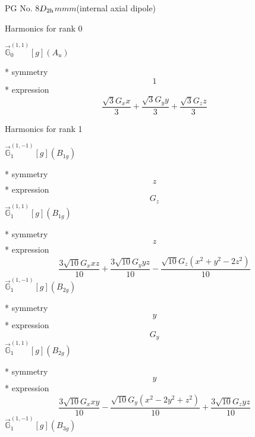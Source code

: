 \documentclass[fleqn,8pt]{jsarticle}
\begin{document}
\setcounter{MaxMatrixCols}{32}

\renewcommand{\tablename}{Table~}
\renewcommand{\figurename}{Figure~}
\begin{center}
\LARGE
PG No. 8\quad$D_{\rm 2h}$\quad$mmm$\quad[ orthorhombic ] (internal axial dipole)
\end{center}

\noindent * Harmonics for rank 0

\noindent\quad $\vec{\mathbb{G}}_{0}^{(1,1)}[g](A_{u})$

\noindent\quad ** symmetry
\begin{dmath*}
1
\end{dmath*}
\noindent\quad ** expression
\begin{dmath*}
\frac{\sqrt{3} G_{x} x}{3} + \frac{\sqrt{3} G_{y} y}{3} + \frac{\sqrt{3} G_{z} z}{3}
\end{dmath*}

\noindent * Harmonics for rank 1

\noindent\quad $\vec{\mathbb{G}}_{1}^{(1,-1)}[g](B_{1g})$

\noindent\quad ** symmetry
\begin{dmath*}
z
\end{dmath*}
\noindent\quad ** expression
\begin{dmath*}
G_{z}
\end{dmath*}
\noindent\quad $\vec{\mathbb{G}}_{1}^{(1,1)}[g](B_{1g})$

\noindent\quad ** symmetry
\begin{dmath*}
z
\end{dmath*}
\noindent\quad ** expression
\begin{dmath*}
\frac{3 \sqrt{10} G_{x} x z}{10} + \frac{3 \sqrt{10} G_{y} y z}{10} - \frac{\sqrt{10} G_{z} \left(x^{2} + y^{2} - 2 z^{2}\right)}{10}
\end{dmath*}
\noindent\quad $\vec{\mathbb{G}}_{1}^{(1,-1)}[g](B_{2g})$

\noindent\quad ** symmetry
\begin{dmath*}
y
\end{dmath*}
\noindent\quad ** expression
\begin{dmath*}
G_{y}
\end{dmath*}
\noindent\quad $\vec{\mathbb{G}}_{1}^{(1,1)}[g](B_{2g})$

\noindent\quad ** symmetry
\begin{dmath*}
y
\end{dmath*}
\noindent\quad ** expression
\begin{dmath*}
\frac{3 \sqrt{10} G_{x} x y}{10} - \frac{\sqrt{10} G_{y} \left(x^{2} - 2 y^{2} + z^{2}\right)}{10} + \frac{3 \sqrt{10} G_{z} y z}{10}
\end{dmath*}
\noindent\quad $\vec{\mathbb{G}}_{1}^{(1,-1)}[g](B_{3g})$
\end{document}
